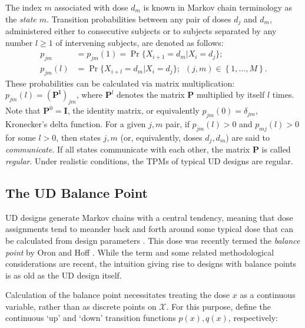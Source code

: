 The index $m$ associated with dose $d_m$ is known in Markov chain terminology as the \emph{state $m$}. Transition probabilities between any pair of doses $d_j$ and $d_m$, administered either to consecutive subjects or to subjects separated by any number $l\geq 1$ of intervening subjects, are denoted as follows:
\begin{equation*}
\begin{array}{rl}
p_{jm}&=p_{jm}(1)=\Pr\{X_{i+1}=d_m|X_i=d_j\};\\
p_{jm}(l)&=\Pr\{X_{i+l}=d_m|X_i=d_j\};\,\,\,(j,m)\in\left\{1,\ldots,M\right\}.
\end{array}
\end{equation*}
These probabilities can be calculated via matrix multiplication: $p_{jm}(l)=\left(\mathbf{P^l}\right)_{jm}$, where $\mathbf{P}^l$ denotes the matrix $\mathbf{P}$ multiplied by itself $l$ times.  Note that $\mathbf{P}^0=\mathbf{I}$, the identity matrix, or equivalently $p_{jm}(0)=\delta_{jm}$, Kronecker's delta function. For a given $j,m$ pair, if $p_{jm}(l)>0$ and $p_{mj}(l)>0$  for some $l>0$, then states $j,m$ (or, equivalently, doses $d_j,d_m$) are said to \emph{communicate}. If all states communicate with each other, the matrix $\mathbf{P}$ is called \emph{regular}. Under realistic conditions, the TPMs of typical UD designs are regular.


\subsection{The UD Balance Point}

UD designs generate Markov chains with a central tendency, meaning that dose assignments tend to meander back and forth around some typical dose that can be calculated from design parameters \citep{Durh:Flou:rand:1994,Hugh:Rand:1995}. This dose was recently termed the \emph{balance point} by Oron and Hoff \citep{Oron:Hoff:thek:2009}. While the term and some related methodological considerations are recent, the intuition giving rise to designs with balance points is as old as the UD design itself.

Calculation of the balance point necessitates treating the dose $x$ as a continuous variable, rather than as discrete points on $\mathcal{X}$. For this purpose, define the continuous `up' and `down' transition functions $p(x),q(x)$, respectively:

